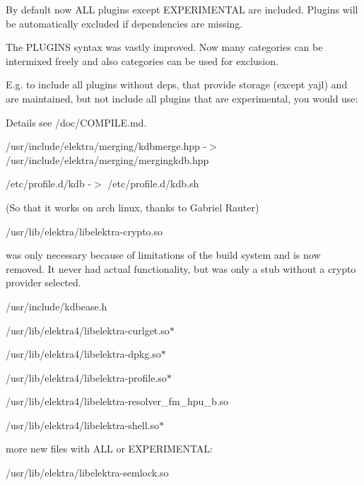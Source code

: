 By default now A\+LL plugins except E\+X\+P\+E\+R\+I\+M\+E\+N\+T\+AL are included. Plugins will be automatically excluded if dependencies are missing.

The P\+L\+U\+G\+I\+NS syntax was vastly improved. Now many categories can be intermixed freely and also categories can be used for exclusion.

E.\+g. to include all plugins without deps, that provide storage (except yajl) and are maintained, but not include all plugins that are experimental, you would use\+:


\begin{DoxyCode}{0}
\end{DoxyCode}


Details see /doc/\+C\+O\+M\+P\+I\+LE.md.

/usr/include/elektra/merging/kdbmerge.hpp -\/$>$ /usr/include/elektra/merging/mergingkdb.hpp

/etc/profile.d/kdb -\/$>$ /etc/profile.d/kdb.\+sh

(So that it works on arch linux, thanks to Gabriel Rauter)


\begin{DoxyItemize}
\item /usr/lib/elektra/libelektra-\/crypto.so
\end{DoxyItemize}

was only necessary because of limitations of the build system and is now removed. It never had actual functionality, but was only a stub without a crypto provider selected.


\begin{DoxyItemize}
\item {\ttfamily /usr/include/kdbease.h}
\item {\ttfamily /usr/lib/elektra4/libelektra-\/curlget.so$\ast$}
\item {\ttfamily /usr/lib/elektra4/libelektra-\/dpkg.so$\ast$}
\item {\ttfamily /usr/lib/elektra4/libelektra-\/profile.so$\ast$}
\item {\ttfamily /usr/lib/elektra4/libelektra-\/resolver\+\_\+fm\+\_\+hpu\+\_\+b.so}
\item {\ttfamily /usr/lib/elektra4/libelektra-\/shell.so$\ast$}
\end{DoxyItemize}

more new files with A\+LL or E\+X\+P\+E\+R\+I\+M\+E\+N\+T\+AL\+:


\begin{DoxyItemize}
\item /usr/lib/elektra/libelektra-\/semlock.so
\end{DoxyItemize}

